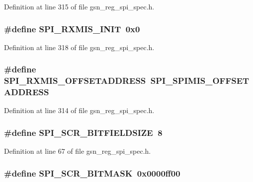 Definition at line 315 of file gsn\_\-reg\_\-spi\_\-spec.h.

\hypertarget{a00573_a0eb9ab11b19ad887df985c8b96cd2d4d}{
\subsubsection[{SPI\_\-RXMIS\_\-INIT}]{\setlength{\rightskip}{0pt plus 5cm}\#define SPI\_\-RXMIS\_\-INIT~0x0}}
\label{a00573_a0eb9ab11b19ad887df985c8b96cd2d4d}


Definition at line 318 of file gsn\_\-reg\_\-spi\_\-spec.h.

\hypertarget{a00573_a27dfb6ca9f79deb890863d46a3a51b8f}{
\subsubsection[{SPI\_\-RXMIS\_\-OFFSETADDRESS}]{\setlength{\rightskip}{0pt plus 5cm}\#define SPI\_\-RXMIS\_\-OFFSETADDRESS~SPI\_\-SPIMIS\_\-OFFSETADDRESS}}
\label{a00573_a27dfb6ca9f79deb890863d46a3a51b8f}


Definition at line 314 of file gsn\_\-reg\_\-spi\_\-spec.h.

\hypertarget{a00573_a618929caf3a02fac794ddcdda362078f}{
\subsubsection[{SPI\_\-SCR\_\-BITFIELDSIZE}]{\setlength{\rightskip}{0pt plus 5cm}\#define SPI\_\-SCR\_\-BITFIELDSIZE~8}}
\label{a00573_a618929caf3a02fac794ddcdda362078f}


Definition at line 67 of file gsn\_\-reg\_\-spi\_\-spec.h.

\hypertarget{a00573_a3bfd772fdcc3bc01e79701d5bfe75d59}{
\subsubsection[{SPI\_\-SCR\_\-BITMASK}]{\setlength{\rightskip}{0pt plus 5cm}\#define SPI\_\-SCR\_\-BITMASK~0x0000ff00}}
\label{a00573_a3bfd772fdcc3bc01e79701d5bfe75d59}


